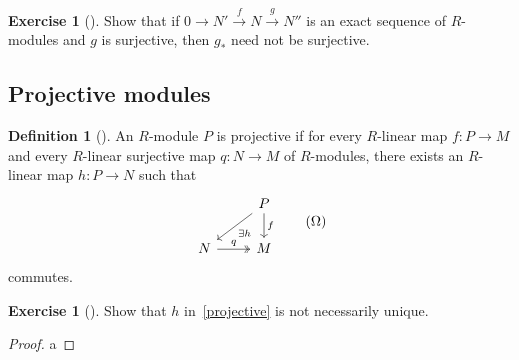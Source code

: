 \documentclass[reqno]{amsart}
\theoremstyle{definition}
\newtheorem{definition}[theorem]{Definition}
\newtheorem{exercise}[theorem]{Exercise}
\theoremstyle{remark}
\begin{document}
        \newpage




        \begin{exercise}[]
            Show that if $0 \to N' \stackrel{f}{\to} N 
            \stackrel{g}{\to} N''$ is an exact sequence
            of $R$-modules and $g$ is surjective, then
            $g_*$ need not be surjective.
        \end{exercise}


        \subsection{Projective modules}

        \begin{definition}[]
            An $R$-module $P$ is projective if for
            every $R$-linear map $f \colon P \to M$ and
            every $R$-linear surjective map $q \colon N \to M$ 
            of $R$-modules, there exists
            an $R$-linear map $h \colon P \to N$ such that
            \begin{equation*}\label{projective}
            \begin{tikzcd}
                & P \ar[dl, "\exists h"] \ar[d, "f"] \\
                N \ar[r, "q", twoheadrightarrow] & M
            \end{tikzcd} \tag{$\Omega$}
            \end{equation*}
            commutes.
        \end{definition}

        \begin{exercise}[]
            Show that $h$ in~\eqref{projective}
            is not necessarily unique.
        \end{exercise}

        \begin{proof}
            a
        \end{proof}
        





\end{document}
